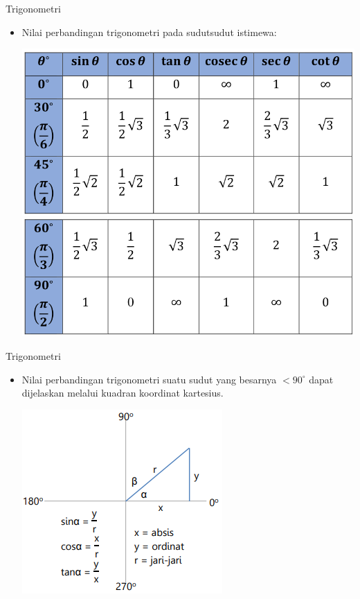 \documentclass[pdflatex,compress,mathserif]{beamer}
\begin{document}
	\begin{frame}{Trigonometri}
		\begin{itemize}
			\item Nilai perbandingan trigonometri pada sudutsudut istimewa:
			\begin{center}
				\includegraphics[width=0.7\linewidth]{pict/21}
				\includegraphics[width=0.7\linewidth]{pict/22}
			\end{center}
		\end{itemize}
	\end{frame}
	
	\begin{frame}{Trigonometri}
		\begin{itemize}
			\item Nilai perbandingan trigonometri suatu sudut yang besarnya $ < 90^{\circ} $ dapat dijelaskan melalui kuadran koordinat kartesius.
			\begin{center}
				\includegraphics[width=0.5\linewidth]{pict/23}
			\end{center}
		\end{itemize}
	\end{frame}
\end{document}
